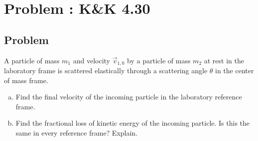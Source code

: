 \documentclass[solutions]{esg8012pset}
\begin{document}
\section{Problem \thesection: K\&K 4.30}
\subsection{Problem}
  A particle of mass $m_1$ and velocity $\vec v_{1,0}$ by a particle of mass $m_2$ at rest in the laboratory frame is scattered elastically through a scattering angle $\theta$ in the center of mass frame.
  \begin{enumerate}[(a)]
    \item Find the final velocity of the incoming particle in the laboratory reference frame.
    \item Find the fractional loss of kinetic energy of the incoming particle. Is this the same in every reference frame? Explain.
  \end{enumerate}
\end{document}
